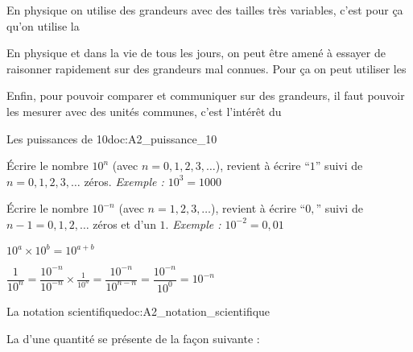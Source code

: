 \teteSndMeth


\begin{contexte}
  En physique on utilise des grandeurs avec des tailles très variables, c'est pour ça qu'on utilise la 
  
  En physique et dans la vie de tous les jours, on peut être amené à essayer de raisonner rapidement sur des grandeurs mal connues. Pour ça on peut utiliser les 

  Enfin, pour pouvoir comparer et communiquer sur des grandeurs, il faut pouvoir les mesurer avec des unités communes, c'est l'intérêt du 
\end{contexte}

\vspace*{-12pt}

\begin{doc}{Les puissances de 10}{doc:A2_puissance_10}
  \begin{importants}
  \begin{listePoints}
    \item Écrire le nombre $10^n$ (avec $n = 0, 1, 2, 3, \ldots$), revient à écrire ``$1$'' suivi de $n = 0, 1, 2, 3, \ldots$ zéros. \textit{Exemple : $10^3 = 1000$}
    \item Écrire le nombre $10^{-n}$ (avec $n = 1, 2, 3, \ldots$), revient à écrire ``$0,$'' suivi de $n - 1 = 0, 1, 2, \ldots$ zéros et d'un $1$. \textit{Exemple : $10^{-2} = 0,\!01$}
    \item $10^a \times 10^b = 10^{a + b}$
    \item $\dfrac{1}{10^n} 
    = \dfrac{10^{-n}}{10^{-n}} \times \frac{1}{10^n} 
    = \dfrac{10^{-n}}{10^{n - n}}
    = \dfrac{10^{-n}}{10^0}
    = 10^{-n}$
  \end{listePoints}
  \end{importants}
\end{doc}
\bigskip

\begin{doc}{La notation scientifique}{doc:A2_notation_scientifique}
  \begin{importants}
  La  d'une quantité se présente de la façon suivante :
  \begin{center}
    \qq{}
    \qq{}
  \end{center}
  \vspace*{-30pt} \hspace*{4pt}
  \end{importants}
\end{doc}

